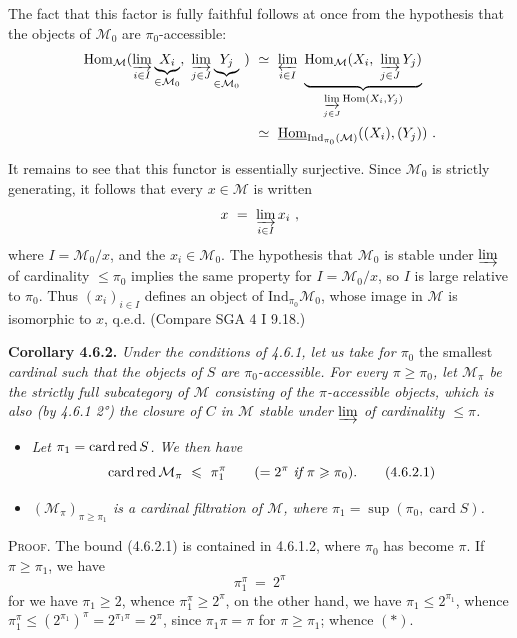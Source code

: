 \documentclass[11pt]{article}
\newcommand{\printedpage}[1]{\marginpar{\footnotesize p.~#1}}
\newcommand{\msp}[1]{\marginpar{\footnotesize [#1]}}
\newcommand{\cardred}{\mathop{\mathrm{card}\,\textup{red}}\nolimits}
\newcommand{\Ind}{\mathrm{Ind}}
\begin{document}
The fact that this factor is fully faithful follows at once from the hypothesis that the objects of $\mathcal{M}_0$ are $\pi_0$-accessible: %
\[
\begin{aligned}
\operatorname{Hom}_{\mathcal{M}}(\varinjlim_{i\in I}\underbrace{X_i}_{\in\mathcal{M}_0},\ \varinjlim_{j\in J}\underbrace{Y_j}_{\in\mathcal{M}_0}\ ) &\ \simeq\ \varprojlim_{i\in I}\ \underbrace{\operatorname{Hom}_{\mathcal{M}}(X_i,\ \varinjlim_{j\in J}Y_j)}_{\varinjlim\limits_{j\in J}\operatorname{Hom}(X_i,Y_j)}\\
&\ \simeq\ \underline{\operatorname{Hom}}_{\Ind_{\pi_0}(\mathcal{M})}((X_i),(Y_j))\ .
\end{aligned}
\]

\msp{page 145}

It remains to see that this functor is essentially surjective. Since $\mathcal{M}_0$ is strictly generating, it follows that every $x\in\mathcal{M}$ is written
\[
x \ =\ \varinjlim_{i\in I}x_i\ ,
\]
where $I=\mathcal{M}_0/x$, and the $x_i\in\mathcal{M}_0$. The hypothesis that $\mathcal{M}_0$ is stable under $\varinjlim$ of cardinality $\leqslant\pi_0$ implies the same property for $I=\mathcal{M}_0/x$, so $I$ is large relative to $\pi_0$. Thus $(x_i)_{i\in I}$ defines an object of $\Ind_{\pi_0}\mathcal{M}_0$, whose image in $\mathcal{M}$ is isomorphic to $x$, q.e.d. (Compare SGA 4 I 9.18.)

\textbf{Corollary 4.6.2.} \textit{Under the conditions of 4.6.1, let us take for $\pi_0$} the smallest \textit{cardinal such that the objects of $S$ are $\pi_0$-accessible. For every $\pi\geqslant\pi_0$, let $\mathcal{M}_\pi$ be the strictly full subcategory of $\mathcal{M}$ consisting of the $\pi$-accessible objects, which is also (by 4.6.1 2°) the closure of $C$ in $\mathcal{M}$ stable under $\varinjlim$ of cardinality $\leqslant\pi$.}
\begin{itemize}[leftmargin=2.5em]
\item[\textit{1°)}] \textit{Let $\pi_1=\cardred S$. We then have}
\[
\cardred\mathcal{M}_\pi \ \leqslant\ \pi_1^{\pi} \qquad (=2^{\pi}\ \textit{if}\ \pi\geqslant\pi_0). \tag*{(4.6.2.1)}
\]
\printedpage{47}
\msp{page 146}
\item[\textit{2°)}] \textit{$(\mathcal{M}_\pi)_{\pi\geqslant\pi_1}$ is a cardinal filtration of $\mathcal{M}$, where $\pi_1=\sup(\pi_0,\operatorname{card}S)$.}
\end{itemize}

\textsc{Proof}. The bound (4.6.2.1) is contained in 4.6.1.2, where $\pi_0$ has become $\pi$. If $\pi\geqslant\pi_1$, we have
\[
\pi_1^{\pi} \ =\ 2^{\pi} \tag*{$(*)$}
\]
for we have $\pi_1\geqslant2$, whence $\pi_1^{\pi}\geqslant2^{\pi}$, on the other hand, we have $\pi_1\leqslant2^{\pi_1}$, whence $\pi_1^{\pi}\leqslant(2^{\pi_1})^{\pi}=2^{\pi_1\pi}=2^{\pi}$, since $\pi_1\pi=\pi$ for $\pi\geqslant\pi_1$; whence $(*)$.
\end{document}
